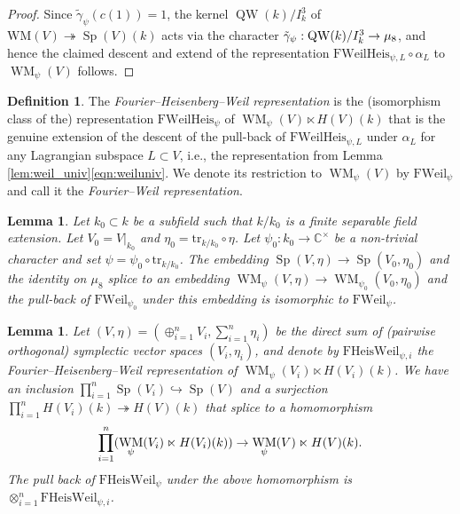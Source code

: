 \documentclass{article}
\def\C{\mathbb{C}}
\DeclareMathOperator{\Sp}{Sp}
\newtheorem{lem}[thm]{Lemma}
\theoremstyle{definition}
\newtheorem{dfn}[thm]{Definition}
\numberwithin{equation}{subsection}
\renewcommand{\-}{\hyp{}}
\DeclareMathOperator{\WM}{WM}
\newcommand{\WMuniv}{\mathrm{WM}}
\DeclareMathOperator{\QW}{QW}
\begin{document}
\begin{appendices}
\begin{proof}
	Since $\tilde\gamma_\psi(c(1))=1$, the kernel $\QW(k)/I_k^3$ of $\WMuniv(V) \twoheadrightarrow \Sp(V)(k)$ acts via the character $\tilde\gamma_\psi:\QW(k)/I_k^3 \ra \mu_8$, and hence the claimed descent and extend of the representation $\mathrm{FWeilHeis}_{\psi,L}\circ\alpha_{L}$ to $\WM_{\psi}(V)$ follows.
\end{proof}

\begin{dfn} \label{dfn:weiluniv} The \emph{Fourier--Heisenberg--Weil representation} is the (isomorphism class of the) representation $\mathrm{FWeilHeis}_\psi$ of $\WM_\psi(V) \ltimes H(V)(k)$ that is the genuine extension of the descent of the pull-back of $\mathrm{FWeilHeis}_{\psi,L}$ under $\alpha_L$ for any Lagrangian subspace $L \subset V$, i.e., the representation from Lemma \ref{lem:weil_univ}\eqref{eqn:weiluniv}. We denote its restriction to $\WM_\psi(V)$ by $\mathrm{FWeil}_\psi$ and call it the \emph{Fourier--Weil representation}.
\end{dfn}
 
\begin{lem} \label{lem:fweilrest} 
Let $k_0 \subset k$ be a subfield such that $k/k_0$ is a finite separable field extension. Let $V_0=V|_{k_0}$ and $\eta_0=\mathrm{tr}_{k/k_0}\circ\eta$. Let $\psi_0 : k_0 \to \C^\times$ be a non-trivial character and set  $\psi=\psi_0 \circ \mathrm{tr}_{k/k_0}$. The embedding $\Sp(V,\eta) \to \Sp(V_0,\eta_0)$ and the identity on $\mu_8$ splice to an embedding $\WM_\psi(V,\eta) \to \WM_{\psi_0}(V_0,\eta_0)$ and the pull-back of $\mathrm{FWeil}_{\psi_0}$ under this embedding is isomorphic to $\mathrm{FWeil}_\psi$.
\end{lem}


\begin{lem} \label{lem:fweilproduct} 
	Let $(V, \eta)=(\oplus_{i=1}^n V_i, \sum_{i=1}^n\eta_i)$ be the direct sum of (pairwise orthogonal) symplectic vector spaces $(V_i,\eta_i)$, and denote by $\mathrm{FHeisWeil}_{\psi,i}$ the Fourier--Heisenberg--Weil representation of $\WM_\psi(V_i) \ltimes H(V_i)(k)$. We have an inclusion $\prod_{i=1}^n\Sp(V_i) \hookrightarrow \Sp(V)$ and a surjection $\prod_{i=1}^n H(V_i)(k) \twoheadrightarrow H(V)(k)$ that splice to a homomorphism 
	\[\prod_{i=1}^n (\WM_\psi(V_i) \ltimes H(V_i)(k)) \ra \WM_\psi(V) \ltimes H(V)(k). \]
	The pull back of $\mathrm{FHeisWeil}_\psi$ under the above homomorphism is $\otimes_{i=1}^n\mathrm{FHeisWeil}_{\psi,i}$.
\end{lem}



\end{appendices}
\end{document}
